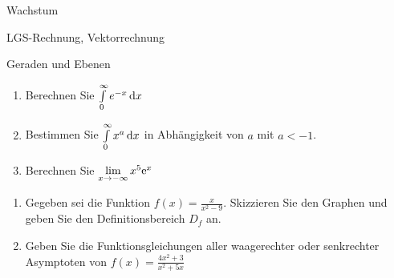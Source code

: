 


\begin{inhalt}
	\item Wachstum
	\item LGS-Rechnung, Vektorrechnung
	\item Geraden und Ebenen
\end{inhalt}

\begin{enumerate}
	\item Berechnen Sie $\int\limits^\infty_0 e^{-x}\,\mathrm{d} x$
	\item	Bestimmen Sie $\int\limits^\infty_0 x^a\,\mathrm{d} x$ in Abhängigkeit von $a$ mit $a < -1$.
	\item Berechnen Sie $\lim\limits_{x\rightarrow -\infty} x^5\mathrm{e}^x$
\end{enumerate}

\begin{enumerate}
	\item Gegeben sei die Funktion $f(x)=\frac{x}{x^2-9}$. Skizzieren Sie den Graphen und geben Sie den Definitionsbereich $D_f$ an.
	\item	Geben Sie die Funktionsgleichungen aller waagerechter oder senkrechter Asymptoten von $f(x)=\frac{4x^2+3}{x^2+5x}$
\end{enumerate}

